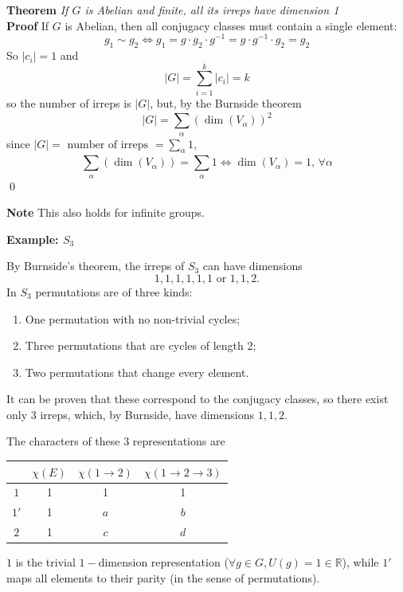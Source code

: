 \textbf{Theorem} \textit{If $G$ is Abelian and finite, all its irreps have
dimension 1}\\
\textbf{Proof} If $G$ is Abelian, then all conjugacy classes must contain a single
element:
$$g_1\sim g_2 \iff g_1 = g\cdot g_2\cdot g^{-1}=g\cdot g^{-1}\cdot g_2=g_2$$
So $|c_i|=1$ and
$$|G|=\sum_{i=1}^{k}|c_i| = k $$
so the number of irreps is $|G|$, but, by the Burnside theorem
$$|G|=\sum_{\alpha}^{}(\dim(V_\alpha))^2$$
since $|G|=\text{ number of irreps }=\sum_{\alpha}^{}1$,
$$\sum_{\alpha}^{}(\dim(V_\alpha))=\sum_{\alpha}^{}1\iff\dim(V_\alpha)=1,\,
\forall\alpha$$\qed

\textbf{Note} This also holds for infinite groups.

\textbf{Example: $S_3$}

By Burnside's theorem, the irreps of $S_3$ can have dimensions
$$1,1,1,1,1,1\text{ or }1,1,2.$$
In $S_3$ permutations are of three kinds:
\begin{enumerate}
    \item One permutation with no non-trivial cycles;
    \item Three permutations that are cycles of length 2;
    \item Two permutations that change every element.
\end{enumerate}
It can be proven that these correspond to the conjugacy classes, so there exist
only $3$ irreps, which, by Burnside, have dimensions $1,1,2$.

The characters of these $3$ representations are
\begin{table}[h]
    \centering
    \begin{tabular}{c|c|c|c}
            &$\chi(E)$&$\chi(1\to2)$&$\chi(1\to2\to3)$\\ \hline
        $1$ &   1&1&1\\\hline
        $1'$&   1&$a$&$b$\\\hline
        $2$ &   1&$c$&$d$
\end{tabular}
\end{table}\newpage
$1$ is the trivial $1-$dimension representation ($\forall g\in G, U(g)=1\in
\mathbb{R}$), while $1'$ maps all elements to their parity (in the sense of
permutations).

